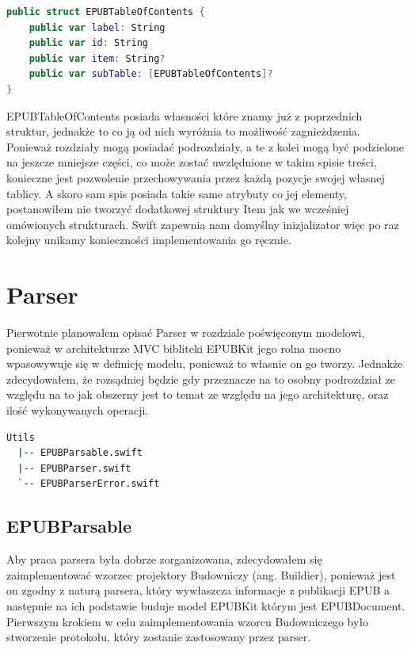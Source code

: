 \begin{lstlisting}[caption={Struktura EPUBTableOfContents.}, language=swift]
public struct EPUBTableOfContents {
    public var label: String
    public var id: String
    public var item: String?
    public var subTable: [EPUBTableOfContents]?
}
\end{lstlisting}

EPUBTableOfContents posiada własności które znamy już z poprzednich struktur, jednakże to co ją od nich wyróżnia to możliwość zagnieżdzenia. Ponieważ rozdziały mogą posiadać podrozdziały, a te z kolei mogą być podzielone na jeszcze mniejsze części, co może zostać uwzlędnione w takim spisie treści, konieczne jest pozwolenie przechowywania przez każdą pozycje swojej własnej tablicy. A skoro sam spis posiada takie same atrybuty co jej elementy, postanowiłem nie tworzyć dodatkowej struktury Item jak we wcześniej omówionych strukturach. Swift zapewnia nam domyślny inizjalizator więc po raz kolejny unikamy konieczności implementowania go ręcznie.

\section{Parser}

Pierwotnie planowałem opisać Parser w rozdziale poświęconym modelowi, ponieważ w architekturze MVC bibliteki EPUBKit jego rolna mocno wpasowywuje się w definicję modelu, ponieważ to własnie on go tworzy. Jednakże zdecydowałem, że rozsądniej będzie gdy przeznacze na to osobny podrozdział ze względu na to jak obszerny jest to temat ze względu na jego architekturę, oraz ilość wykonywanych operacji.

\begin{lstlisting}[caption={Struktura folderu narzędzi służacych modelowi EPUBKit.}, language=bash]
  Utils
  |-- EPUBParsable.swift
  |-- EPUBParser.swift
  `-- EPUBParserError.swift
\end{lstlisting}

\subsection{EPUBParsable}

Aby praca parsera była dobrze zorganizowana, zdecydowałem się zaimplementować wzorzec projektory Budowniczy (ang. Buildier), ponieważ jest on zgodny z naturą parsera, który wywłaszcza informacje z publikacji EPUB a następnie na ich podstawie buduje model EPUBKit którym jest EPUBDocument. Pierwszym krokiem w celu zaimplementowania wzorcu Budowniczego było stworzenie protokołu, który zostanie zastosowany przez parser.

